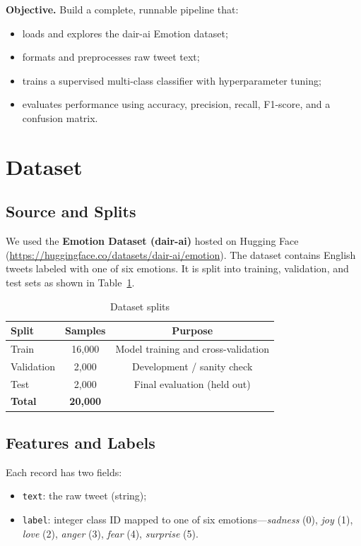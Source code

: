 \documentclass[12pt]{article}
\begin{document}
\textbf{Objective.} Build a complete, runnable pipeline that:
\begin{itemize}
    \item loads and explores the dair-ai Emotion dataset;
    \item formats and preprocesses raw tweet text;
    \item trains a supervised multi-class classifier with hyperparameter tuning;
    \item evaluates performance using accuracy, precision, recall, F1-score, and a confusion matrix.
\end{itemize}

\section{Dataset}

\subsection{Source and Splits}

We used the \textbf{Emotion Dataset (dair-ai)} hosted on Hugging Face (\url{https://huggingface.co/datasets/dair-ai/emotion}).
The dataset contains English tweets labeled with one of six emotions.
It is split into training, validation, and test sets as shown in Table~\ref{tab:splits}.

\begin{table}[H]
\centering
\caption{Dataset splits}
\label{tab:splits}
\begin{tabular}{lcc}
\toprule
\textbf{Split} & \textbf{Samples} & \textbf{Purpose} \\
\midrule
Train & 16{,}000 & Model training and cross-validation \\
Validation & 2{,}000 & Development / sanity check \\
Test & 2{,}000 & Final evaluation (held out) \\
\midrule
\textbf{Total} & \textbf{20{,}000} & \\
\bottomrule
\end{tabular}
\end{table}

\subsection{Features and Labels}

Each record has two fields:
\begin{itemize}
    \item \texttt{text}: the raw tweet (string);
    \item \texttt{label}: integer class ID mapped to one of six emotions---\textit{sadness} (0), \textit{joy} (1), \textit{love} (2), \textit{anger} (3), \textit{fear} (4), \textit{surprise} (5).
\end{itemize}
\end{document}
